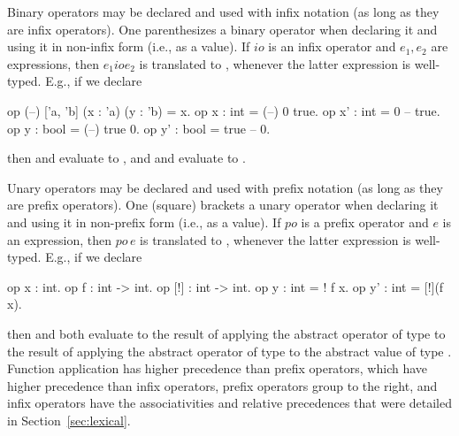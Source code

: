 Binary operators may be declared and used with infix notation (as long
as they are infix operators). One parenthesizes a binary operator when
declaring it and using it in non-infix form (i.e., as a value).  If
$\mathit{io}$ is an infix operator and $e_1,e_2$ are expressions, then
$e_1\mathbin{\mathit{io}}e_2$ is translated to , whenever the latter expression is
well-typed. E.g., if we declare
\begin{easycrypt}{}{}
op (--) ['a, 'b] (x : 'a) (y : 'b) = x.
op x : int = (--) 0 true.
op x' : int = 0 -- true.
op y : bool = (--) true 0.
op y' : bool = true -- 0.
\end{easycrypt}
then  and  evaluate to , and
 and  evaluate to .

Unary operators may be declared and used with prefix notation
(as long as they are prefix operators).
One (square) brackets a unary operator when
declaring it and using it in non-prefix form (i.e., as a value).
If $\mathit{po}$ is
a prefix operator and $e$ is an expression, then
$\mathit{po}\,e$ is translated to
, whenever the latter
expression is well-typed. E.g., if we declare
\begin{easycrypt}{}{}
op x : int.
op f : int -> int.
op [!] : int -> int.
op y : int = ! f x.
op y' : int = [!](f x).
\end{easycrypt}
then  and  both evaluate to the result of applying the
abstract operator \ec{!} of type  to the result of
applying the abstract operator  of type  to the
abstract value  of type .  Function application has
higher precedence than prefix operators, which have higher precedence
than infix operators, prefix operators group to the right, and infix
operators have the associativities and relative precedences that were
detailed in Section~\ref{sec:lexical}.

